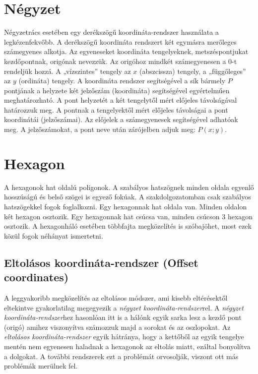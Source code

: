 
\section{Négyzet}

Négyzetrács esetében egy derékszögű koordináta-rendszer használata a legkézenfekvőbb. 
\newline
\newline A derékszögű koordináta rendszert két egymásra merőleges számegyenes alkotja. Az egyeneseket koordináta tengelyeknek, metszéspontjukat kezdőpontnak, origónak nevezzük. Az origóhoz mindkét számegyenesen a $0$-t rendeljük hozzá. A „vízszintes” tengely az $x$ (abszcissza) tengely, a „függőleges” az $y$ (ordináta) tengely.
\newline
\newline A koordináta rendszer segítségével a sík bármely $P$ pontjának a helyzete két jelzőszám (koordináta) segítségével egyértelműen meghatározható. A pont helyzetét a két tengelytől mért előjeles távolságával határozzuk meg. A pontnak a tengelyektől mért előjeles távolságai a pont koordinátái (jelzőszámai). Az előjelek a számegyenesek segítségével adhatóak meg. A jelzőszámokat, a pont neve után zárójelben adjuk meg: $P(x;y)$.

\section{Hexagon}

A hexagonok hat oldalú poligonok. A szabályos hatszögnek minden oldala egyenlő hosszúságú és belső szögei is egyező fokúak. A szakdolgozatomban csak szabályos hatszögekkel fogok foglalkozni. 
\newline
\newline Egy hexagonnak hat oldala van. Minden oldalon két hexagon osztozik. Egy hexagonnak hat csúcsa van, minden csúcson 3 hexagon osztozik.
\newline
\newline A hexagonháló esetében többfajta megközelítés is szóbajöhet, most ezek közül fogok néhányat ismertetni. 

\subsection{Eltolásos koordináta-rendszer (Offset coordinates)}

A leggyakoribb megközelítés az eltolásos módszer, ami kisebb eltérésektől eltekintve gyakorlatilag megegyezik a \textit{négyzet koordináta-rendszer}rel. 
\newline
\newline A \textit{négyzet koordináta-rendszer}hez hasonlóan itt is a hálónk egyik sarka lesz a kezdő pont (origó) amihez viszonyítva számozzuk majd a sorokat és az oszlopokat.
\newline
\newline Az \textit{eltolásos koordináta-rendszer} egyik hátránya, hogy a kettőből az egyik tengelye mentén nem egyenesen haladnak a hexagonok az eltolás miatt, ezáltal bonyolítva a dolgokat. A további rendszerek ezt a problémát orvosolják, viszont ott más problémák merülnek fel.	

